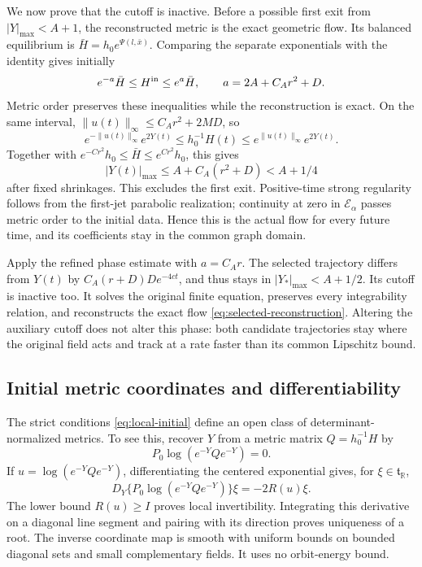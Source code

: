 \documentclass[11pt]{amsart}
\theoremstyle{definition}
\theoremstyle{remark}
\newcommand{\RR}{\mathbb R}
\begin{document}
We now prove that the cutoff is inactive. Before a possible first
exit from $|Y|_{\max}<A+1$, the reconstructed metric is the exact
geometric flow. Its balanced equilibrium is
$\bar H=h_0e^{\Psi(l,\bar x)}$. Comparing the separate
exponentials with the identity gives initially
\[
 e^{-a}\bar H\le H^{\rm in}\le e^a\bar H,\qquad
 a=2A+C_Ar^2+D.
\]
Metric order preserves these inequalities while the reconstruction
is exact. On the same interval,
$\|u(t)\|_\infty\le C_Ar^2+2MD$, so
\[
 e^{-\|u(t)\|_\infty}e^{2Y(t)}
       \le h_0^{-1}H(t)
       \le e^{\|u(t)\|_\infty}e^{2Y(t)}.
\]
Together with $e^{-Cr^2}h_0\le\bar H\le e^{Cr^2}h_0$,
this gives
\begin{equation}\label{eq:diagonal-confinement}
 |Y(t)|_{\max}\le A+C_A(r^2+D)<A+1/4
\end{equation}
after fixed shrinkages. This excludes the first exit. Positive-time
strong regularity follows from the first-jet parabolic realization;
continuity at zero in $\mathcal E_\alpha$ passes metric order
to the initial data. Hence this is the actual flow for every
future time, and its coefficients stay in the common graph domain.

Apply the refined phase estimate with $a=C_Ar$.
The selected trajectory differs from $Y(t)$ by
$C_A(r+D)De^{-4ct}$, and thus stays in $|Y_*|_{\max}<A+1/2$.
Its cutoff is inactive too. It solves the original finite equation,
preserves every integrability relation, and reconstructs the exact
flow \eqref{eq:selected-reconstruction}. Altering the auxiliary
cutoff does not alter this phase: both candidate trajectories stay
where the original field acts and track at a rate faster than
its common Lipschitz bound.

\subsection{Initial metric coordinates and differentiability}
The strict conditions \eqref{eq:local-initial} define an open
class of determinant-normalized metrics. To see this, recover
$Y$ from a metric matrix $Q=h_0^{-1}H$ by
\begin{equation}\label{eq:normalization}
 P_0\log(e^{-Y}Qe^{-Y})=0.
\end{equation}
If $u=\log(e^{-Y}Qe^{-Y})$, differentiating the centered
exponential gives, for $\xi\in\mathfrak t_{\RR}$,
\[
 D_Y\{P_0\log(e^{-Y}Qe^{-Y})\}\xi=-2R(u)\xi.
\]
The lower bound $R(u)\ge I$ proves local invertibility.
Integrating this derivative on a diagonal line segment and pairing
with its direction proves uniqueness of a root. The inverse
coordinate map is smooth with uniform bounds on bounded diagonal
sets and small complementary fields. It uses no orbit-energy bound.
\end{document}
